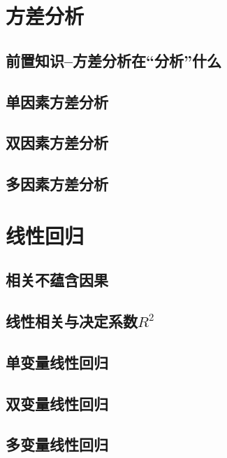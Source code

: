 \documentclass[lang=cn,10pt]{elegantbook}
\begin{document}
\chapter{方差分析}
\section{前置知识--方差分析在“分析”什么}



\section{单因素方差分析}



\section{双因素方差分析}



\section{多因素方差分析}





\chapter{线性回归}
\section{相关不蕴含因果}



\section{线性相关与决定系数$R^2$}



\section{单变量线性回归}



\section{双变量线性回归}



\section{多变量线性回归}
\end{document}
